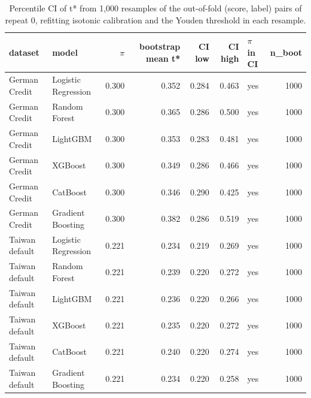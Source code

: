 \begin{table}[t]
\centering
\caption{Percentile CI of t* from 1,000 resamples of the out-of-fold (score, label) pairs of repeat 0, refitting isotonic calibration and the Youden threshold in each resample.}
\label{tab:T16d_external_tstar_ci}
\small
\begin{tabular}{llrrrrlr}
\toprule
dataset & model & $\pi$ & bootstrap mean t* & CI low & CI high & $\pi$ in CI & n\_boot \\
\midrule
German Credit & Logistic Regression & 0.300 & 0.352 & 0.284 & 0.463 & yes & 1000 \\
German Credit & Random Forest & 0.300 & 0.365 & 0.286 & 0.500 & yes & 1000 \\
German Credit & LightGBM & 0.300 & 0.353 & 0.283 & 0.481 & yes & 1000 \\
German Credit & XGBoost & 0.300 & 0.349 & 0.286 & 0.466 & yes & 1000 \\
German Credit & CatBoost & 0.300 & 0.346 & 0.290 & 0.425 & yes & 1000 \\
German Credit & Gradient Boosting & 0.300 & 0.382 & 0.286 & 0.519 & yes & 1000 \\
Taiwan default & Logistic Regression & 0.221 & 0.234 & 0.219 & 0.269 & yes & 1000 \\
Taiwan default & Random Forest & 0.221 & 0.239 & 0.220 & 0.272 & yes & 1000 \\
Taiwan default & LightGBM & 0.221 & 0.236 & 0.220 & 0.266 & yes & 1000 \\
Taiwan default & XGBoost & 0.221 & 0.235 & 0.220 & 0.272 & yes & 1000 \\
Taiwan default & CatBoost & 0.221 & 0.240 & 0.220 & 0.274 & yes & 1000 \\
Taiwan default & Gradient Boosting & 0.221 & 0.234 & 0.220 & 0.258 & yes & 1000 \\
\bottomrule
\end{tabular}
\end{table}
